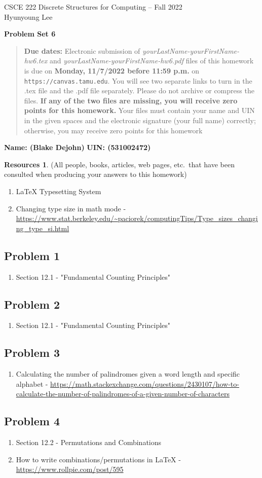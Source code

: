 \documentclass{article}
\theoremstyle{definition}
\newtheorem*{resources}{Resources}
\newcommand{\name}[2]{\noindent\textbf{Name: #1}\hfill \textbf{UIN: #2}
  \newcommand{\myName}{#1}
  \newcommand{\myUIN}{#2}
}
\newcommand{\problemset}[1]{\begin{center}\textbf{Problem Set #1}\end{center}}
\newcommand{\duedate}[1]{\begin{quote}\textbf{Due dates:} Electronic
    submission of \textsl{yourLastName-yourFirstName-hw6.tex} and 
    \textsl{yourLastName-yourFirstName-hw6.pdf} files of this homework is due on
    \textbf{#1} on \texttt{https://canvas.tamu.edu}. You will see two separate links
    to turn in the .tex file and the .pdf file separately. Please do not archive or compress the files.  
    \textbf{If any of the two files are missing, you will receive zero points for this homework.}
    Your files must contain your name and UIN in the given spaces and the electronic signature
    (your full name) correctly; otherwise, you may receive zero points for this homework\end{quote} }
\begin{document}
\begin{center}
{\large
CSCE 222 Discrete Structures for Computing -- Fall 2022\\[.5ex]
Hyunyoung Lee\\}
\end{center}
\problemset{6}
\duedate{Monday, 11/7/2022 before 11:59 p.m.}
\name{ (Blake Dejohn) }{ (531002472) } %
\begin{resources} (All people, books, articles, web pages, etc.\ that
  have been consulted when producing your answers to this homework)
\begin{enumerate}
\subsection*{Resources Overall (used for the whole document)}
\item LaTeX Typesetting System
\item Changing type size in math mode - \url{https://www.stat.berkeley.edu/~paciorek/computingTips/Type_sizes_changing_type_si.html}
\end{enumerate}
\subsection*{Problem 1}
\begin{enumerate}
\item Section 12.1 - "Fundamental Counting Principles"
\end{enumerate}
\subsection*{Problem 2}
\begin{enumerate}
\item Section 12.1 - "Fundamental Counting Principles"
\end{enumerate}
\subsection*{Problem 3}
\begin{enumerate}
\item Calculating the number of palindromes given a word length and specific alphabet - \url{https://math.stackexchange.com/questions/2430107/how-to-calculate-the-number-of-palindromes-of-a-given-number-of-characters}
\end{enumerate}
\subsection*{Problem 4}
\begin{enumerate}
\item Section 12.2 - Permutations and Combinations
\item How to write combinations/permutations in LaTeX - \url{https://www.rollpie.com/post/595}
\end{enumerate}

\end{resources}
\end{document}
